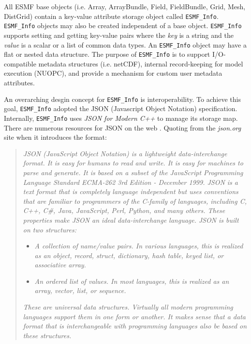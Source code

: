 
All ESMF base objects (i.e. Array, ArrayBundle, Field, FieldBundle, Grid, Mesh, DistGrid) contain a key-value attribute storage object called \texttt{ESMF\_Info}. \texttt{ESMF\_Info} objects may also be created independent of a base object. \texttt{ESMF\_Info} supports setting and getting key-value pairs where the \textit{key} is a string and the \textit{value} is a scalar or a list of common data types. An \texttt{ESMF\_Info} object may have a flat or nested data structure. The purpose of \texttt{ESMF\_Info} is to support I/O-compatible metadata structures (i.e. netCDF), internal record-keeping for model execution (NUOPC), and provide a mechanism for custom user metadata attributes.

An overarching desgin concept for \texttt{ESMF\_Info} is interoperability. To achieve this goal, \texttt{ESMF\_Info} adopted the JSON (Javascript Object Notation) specification. Internally, \texttt{ESMF\_Info} uses \textit{JSON for Modern C++} \cite{json_for_modern_cpp} to manage its storage map. There are numerous resources for JSON on the web \cite{json}. Quoting from the \textit{json.org} site \cite{json} when it introduces the format:
\begin{quote}
    \textit{JSON (JavaScript Object Notation) is a lightweight data-interchange format. It is easy for humans to read and write. It is easy for machines to parse and generate. It is based on a subset of the JavaScript Programming Language Standard ECMA-262 3rd Edition - December 1999. JSON is a text format that is completely language independent but uses conventions that are familiar to programmers of the C-family of languages, including C, C++, C\#, Java, JavaScript, Perl, Python, and many others. These properties make JSON an ideal data-interchange language.}
    \textit{JSON is built on two structures:}
    \begin{itemize}
        \item \textit{A collection of name/value pairs. In various languages, this is realized as an object, record, struct, dictionary, hash table, keyed list, or associative array.}
        \item \textit{An ordered list of values. In most languages, this is realized as an array, vector, list, or sequence.}
    \end{itemize}
    \textit{These are universal data structures. Virtually all modern programming languages support them in one form or another. It makes sense that a data format that is interchangeable with programming languages also be based on these structures.}
\end{quote}

